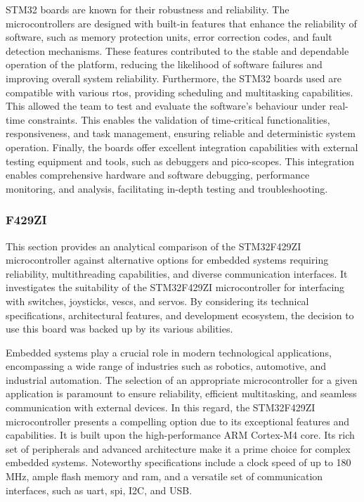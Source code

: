 \documentclass [12pt]{article}
\begin{document}
STM32 boards are known for their robustness and reliability. The microcontrollers are designed with built-in features that enhance the reliability of software, such as memory protection units, error correction codes, and fault detection mechanisms. These features contributed to the stable and dependable operation of the platform, reducing the likelihood of software failures and improving overall system reliability. Furthermore, the STM32 boards used are  compatible with various \gls{rtos}, providing scheduling and multitasking capabilities. This allowed the team to test and evaluate the software's behaviour under real-time constraints. This enables the validation of time-critical functionalities, responsiveness, and task management, ensuring reliable and deterministic system operation. Finally, the boards offer excellent integration capabilities with external testing equipment and tools, such as debuggers and pico-scopes. This integration enables comprehensive hardware and software debugging, performance monitoring, and analysis, facilitating in-depth testing and troubleshooting. 

\subsubsection{F429ZI}
This section provides an analytical comparison of the STM32F429ZI microcontroller against alternative options for embedded systems requiring reliability, multithreading capabilities, and diverse communication interfaces. It investigates the suitability of the STM32F429ZI microcontroller for interfacing with switches, joysticks, \gls{vesc}s, and servos. By considering its technical specifications, architectural features, and development ecosystem, the decision to use this board was backed up by its various abilities.  

Embedded systems play a crucial role in modern technological applications, encompassing a wide range of industries such as robotics, automotive, and industrial automation. The selection of an appropriate microcontroller for a given application is paramount to ensure reliability, efficient multitasking, and seamless communication with external devices. In this regard, the STM32F429ZI microcontroller presents a compelling option due to its exceptional features and capabilities. It is built upon the high-performance ARM Cortex-M4 core. Its rich set of peripherals and advanced architecture make it a prime choice for complex embedded systems. Noteworthy specifications include a clock speed of up to 180 MHz, ample flash memory and \gls{ram}, and a versatile set of communication interfaces, such as \gls{uart}, \gls{spi}, I2C, and USB. 
\end{document}
